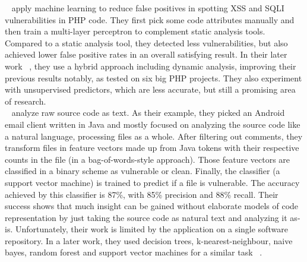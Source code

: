 \documentclass[
	a4paper,
	pagesize,
	pdftex,
	12pt,
	twoside, %
	BCOR=5mm, %
	ngerman,
	fleqn,
	final,
	]{scrartcl}
\begin{document}
~\cite{Shar.2013b} apply machine learning to reduce false positives in spotting XSS and SQLI vulnerabilities in PHP code. They first pick some code attributes manually and then train a multi-layer perceptron to complement static analysis tools. Compared to a static analysis tool, they detected less vulnerabilities, but also achieved lower false positive rates in an overall satisfying result. In their later work ~\cite{Shar.2013}, they use a hybrid approach including dynamic analysis, improving their previous results notably, as tested on six big PHP projects. They also experiment with unsupervised predictors, which are less accurate, but still a promising area of research. \\
~\cite{Hovsepyan.2012} analyze raw source code as text. As their example, they picked an Android email client written in Java and mostly focused on analyzing the source code like a natural language, processing files as a whole. After filtering out comments, they transform files in feature vectors made up from Java tokens with their respective counts in the file (in a bag-of-words-style approach). Those feature vectors are classified in a binary scheme as vulnerable or clean. Finally, the classifier (a support vector machine) is trained to predict if a file is vulnerable. The accuracy achieved by this classifier is 87\%, with 85\% precision and 88\% recall. Their success shows that much insight can be gained without elaborate models of code representation by just taking the source code as natural text and analyzing it as-is. Unfortunately, their work is limited by the application on a single software repository. In a later work, they used decision trees, k-nearest-neighbour, naive bayes, random forest and support vector machines for a similar task ~\cite{Scandariato.2014}.\\
\end{document}

